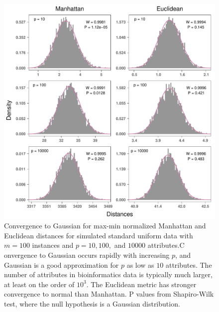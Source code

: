 \documentclass[10pt,letterpaper]{article}\usepackage[]{graphicx}\usepackage[]{color}
\begin{document}
\vspace*{0.2in}

{\Large	
	\textbf{} %
}

\begin{figure}[H]
	\includegraphics[width=\textwidth]{central_limit_hist_uniform_max-min.pdf}
	\caption{Convergence to Gaussian for max-min normalized Manhattan and Euclidean distances for simulated standard uniform data with $m=100$ instances and $p=10, 100,$ and $10000$ attributes.C onvergence to Gaussian occurs rapidly with increasing $p$, and Gaussian is a good approximation for $p$ as low as $10$ attributes. The number of attributes in bioinformatics data is typically much larger, at least on the order of $10^3$. The Euclidean metric has stronger convergence to normal than Manhattan. P values from Shapiro-Wilk test, where the null hypothesis is a Gaussian distribution.}
\end{figure}
\end{document}
